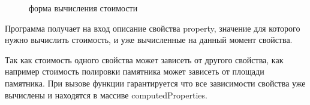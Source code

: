 \documentclass[a4paper,article,14pt]{extarticle}
\begin{document}
\begin{figure}[ht]
\begin{center}
\caption{\label{tpo2} форма вычисления стоимости}
\end {center}
\end {figure}

Программа получает на вход описание свойства property, значение для которого
нужно вычислить стоимость, и уже вычисленные на данный момент свойства.

Так как стоимость одного свойства может зависеть от другого свойства, как
например стоимость полировки памятника может зависеть от площади памятника.
При вызове функции гарантируется что все зависимости свойства уже вычислены
и находятся в массиве computedProperties.
\end{document}
